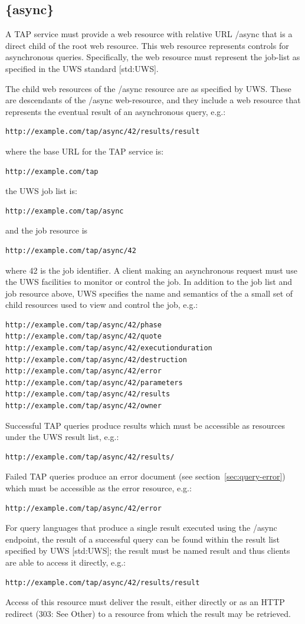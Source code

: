 \documentclass[11pt,letter]{ivoa}
\begin{document}
\subsection{\{async\}}
\label{sec:tap-async}

A TAP service must provide a web resource with relative URL /async that is a 
direct child of the root web resource. This web resource represents controls for 
asynchronous queries. Specifically, the web resource must represent the job-list 
as specified in the UWS standard [std:UWS].

The child web resources of the /async resource are as specified by UWS. These 
are descendants of the /async web-resource, and they include a web resource that 
represents the eventual result of an asynchronous query, e.g.:
\begin{verbatim}
http://example.com/tap/async/42/results/result
\end{verbatim}
where the base URL for the TAP service is:
\begin{verbatim}
http://example.com/tap
\end{verbatim}
the UWS job list is:
\begin{verbatim}
http://example.com/tap/async
\end{verbatim}
and the job resource is
\begin{verbatim}
http://example.com/tap/async/42
\end{verbatim}
where 42 is the job identifier. A client making an asynchronous request must use 
the UWS facilities to monitor or control the job. In addition to the job list 
and job resource above, UWS specifies the name and semantics of the a small set 
of child resources used to view and control the job, e.g.:
\begin{verbatim}
http://example.com/tap/async/42/phase
http://example.com/tap/async/42/quote
http://example.com/tap/async/42/executionduration
http://example.com/tap/async/42/destruction
http://example.com/tap/async/42/error
http://example.com/tap/async/42/parameters
http://example.com/tap/async/42/results
http://example.com/tap/async/42/owner
\end{verbatim}
Successful TAP queries produce results which must be accessible as  resources 
under the UWS result list, e.g.:
\begin{verbatim}
http://example.com/tap/async/42/results/
\end{verbatim}
Failed TAP queries produce an error document (see section~\ref{sec:query-error}) which must be accessible 
as the error resource, e.g.:
\begin{verbatim}
http://example.com/tap/async/42/error
\end{verbatim}
For query languages that produce a single result executed using the /async 
endpoint, the result of a successful query can be found within the result list 
specified by UWS [std:UWS]; the result must be named result and thus clients are able 
to access it directly, e.g.:
\begin{verbatim}
http://example.com/tap/async/42/results/result
\end{verbatim}
Access of this resource must deliver the result, either directly or as an HTTP 
redirect (303: See Other) to a resource from which the result may be retrieved.
\end{document}

